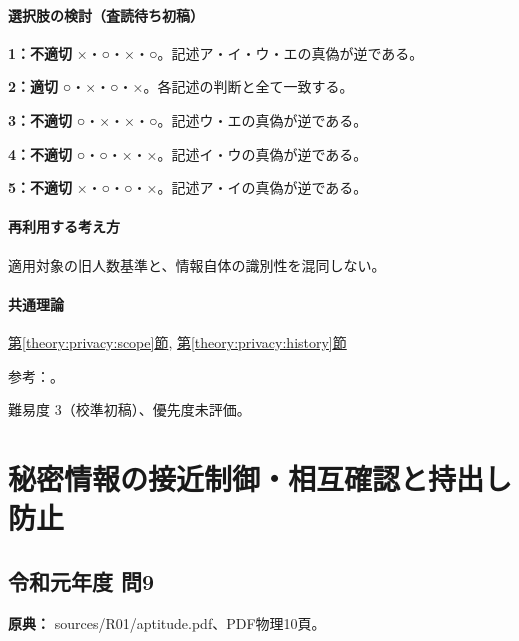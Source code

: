 \paragraph{選択肢の検討（査読待ち初稿）}\mbox{}\par

\noindent\textbf{1：不適切} ×・○・×・○。記述ア・イ・ウ・エの真偽が逆である。\par

\noindent\textbf{2：適切} ○・×・○・×。各記述の判断と全て一致する。\par

\noindent\textbf{3：不適切} ○・×・×・○。記述ウ・エの真偽が逆である。\par

\noindent\textbf{4：不適切} ○・○・×・×。記述イ・ウの真偽が逆である。\par

\noindent\textbf{5：不適切} ×・○・○・×。記述ア・イの真偽が逆である。\par

\paragraph{再利用する考え方} 適用対象の旧人数基準と、情報自体の識別性を混同しない。

\paragraph{共通理論} \hyperref[theory:privacy:scope]{第\ref*{theory:privacy:scope}節}, \hyperref[theory:privacy:history]{第\ref*{theory:privacy:history}節}

\par 参考：\cite{privacy_general,privacy_small2017}。

\par 難易度 3（校準初稿）、優先度未評価。

\section{秘密情報の接近制御・相互確認と持出し防止}

\subsection{令和元年度 問9}
\label{q:r01-reg-apt-09}

\noindent\textbf{原典：} sources/R01/aptitude.pdf、PDF物理10頁。

